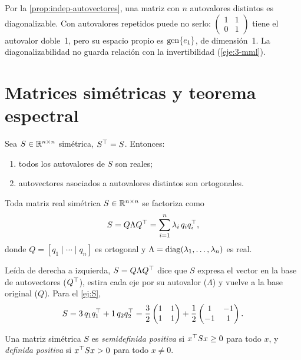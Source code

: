 Por la \cref{prop:indep-autovectores}, una matriz con $n$ autovalores distintos es diagonalizable. Con autovalores repetidos puede no serlo: $\begin{pmatrix}1&1\\0&1\end{pmatrix}$ tiene el autovalor doble~1, pero su espacio propio es $\operatorname{gen}\{e_1\}$, de dimensión~1. La diagonalizabilidad no guarda relación con la invertibilidad (\cref{eje:3-mml}).

\section{Matrices simétricas y teorema espectral}

\begin{teorema}\label{teo:simetricas}
Sea $S\in\mathbb{R}^{n\times n}$ simétrica, $S^{\top}=S$. Entonces:
\begin{enumerate}
  \item todos los autovalores de $S$ son reales;
  \item autovectores asociados a autovalores distintos son ortogonales.
\end{enumerate}
\end{teorema}

\begin{teorema}\label{teo:espectral}
Toda matriz real simétrica $S\in\mathbb{R}^{n\times n}$ se factoriza como
\[
S=Q\Lambda Q^{\top}=\sum_{i=1}^{n}\lambda_i\,q_iq_i^{\top},
\]
donde $Q=[q_1\mid\cdots\mid q_n]$ es ortogonal y $\Lambda=\operatorname{diag}(\lambda_1,\dots,\lambda_n)$ es real.
\end{teorema}

Leída de derecha a izquierda, $S=Q\Lambda Q^{\top}$ dice que $S$ expresa el vector en la base de autovectores ($Q^{\top}$), estira cada eje por su autovalor ($\Lambda$) y vuelve a la base original ($Q$). Para el \cref{ej:S},
\[
S=3\,q_1q_1^{\top}+1\,q_2q_2^{\top}=\frac{3}{2}\begin{pmatrix}1&1\\1&1\end{pmatrix}+\frac{1}{2}\begin{pmatrix}1&-1\\-1&1\end{pmatrix}.
\]

\begin{definicion}
Una matriz simétrica $S$ es \emph{semidefinida positiva} si $x^{\top} Sx\ge 0$ para todo $x$, y \emph{definida positiva} si $x^{\top} Sx>0$ para todo $x\ne 0$.
\end{definicion}

